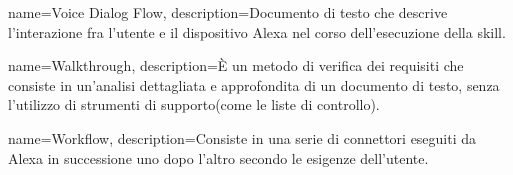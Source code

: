 {
name={Voice Dialog Flow},
description={Documento di testo che descrive l'interazione fra l'utente e il dispositivo Alexa nel corso dell'esecuzione della skill.}
}

{
name={Walkthrough},
description={È un metodo di verifica dei requisiti che consiste in un'analisi dettagliata e approfondita di un documento di testo, senza l'utilizzo di strumenti di supporto(come le liste di controllo).}
}

{
name={Workflow},
description={Consiste in una serie di connettori eseguiti da Alexa in successione uno dopo l'altro secondo le esigenze dell'utente. }
}
